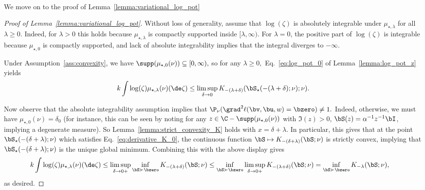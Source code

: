We move on to the proof of Lemma~\ref{lemma:variational_log_pot}
\begin{proof}[Proof of Lemma~\ref{lemma:variational_log_pot}]
Without loss of generality, assume that $\log(\zeta)$ is absolutely integrable under $\mu_{\star,\lambda}$
for all $\lambda\ge 0$. Indeed, for $\lambda>0$ this holds because $\mu_{\star,\lambda}$ is compactly supported inside
$[\lambda,\infty)$.  For $\lambda=0$, the positive part of $\log(\zeta)$ is integrable because
$\mu_{\star,0}$ is compactly supported, and  lack of absolute integrability implies that the integral diverges to $-\infty$.

Under Assumption~\ref{ass:convexity}, we have $\supp(\mu_{\star,0}(\nu))\subseteq[0,\infty),$  so for any $\lambda \ge0,$ Eq.~\eqref{eq:log_pot_0} of Lemma~\ref{lemma:log_pot_z} yields
\begin{equation}
k\int \log(\zeta )\mu_{\star,\lambda}(\nu)(\de\zeta) \le  \limsup_{\delta \to 0}K_{-(\lambda+\delta)}(\bS_{\star}(-(\lambda+\delta);\nu);\nu).
\end{equation}

Now observe that the absolute integrability assumption implies that $\P_\nu(\grad^2\ell(\bv,\bu,w) = \bzero ) \neq 1.$ 
Indeed, otherwise, we must have $\mu_{\star,0}(\nu) = \delta_0$
(for instance, this can be seen by noting for any $z \in\C - \supp(\mu_{\star,0}(\nu))$ with $\Im(z) >0$,
$\bS(z) = \alpha^{-1}z^{-1}\bI$, implying a degenerate measure).
So Lemma~\ref{lemma:strict_convexity_K} holds with $x = \delta + \lambda$.
In particular, this gives that at the point $\bS_\star(-(\delta+\lambda);\nu)$ which satisfies Eq.~\eqref{eq:derivative_K_0}, the continuous function $\bS \mapsto K_{-(\delta+\lambda)}(\bS;\nu)$ is strictly convex, implying that $\bS_\star(-(\delta+\lambda);\nu)$ is the unique global minimum. 
Combining this with the above display gives
\begin{align}
k\int \log(\zeta )\mu_{\star,\lambda}(\nu)(\de\zeta) 
&\le \limsup_{\delta\to 0+}  \inf_{\bS\succ\bzero} K_{-(\lambda+\delta)}(\bS;\nu)
\le 
  \inf_{\bS\succ\bzero}
  \limsup_{\delta\to 0+} 
  K_{-(\lambda+\delta)}(\bS;\nu) = 
  \inf_{\bS\succ\bzero}
  K_{-\lambda}(\bS;\nu),
\end{align}
as desired.

\end{proof}





